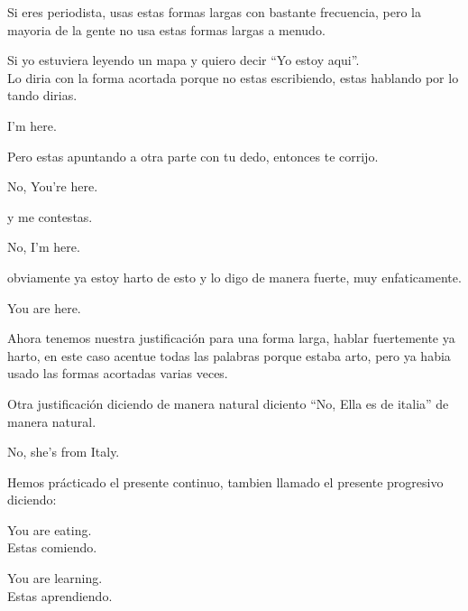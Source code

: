 Si eres periodista, usas estas formas largas con bastante frecuencia,
pero la mayoria de la gente no usa estas formas largas a menudo.

Si yo estuviera leyendo un mapa y quiero decir ``Yo estoy aqui''.\\
Lo diria con la forma acortada porque no estas escribiendo, estas hablando
por lo tando dirias.

I'm here.

Pero estas apuntando a otra parte con tu dedo, entonces te corrijo.

No, You're here.

y me contestas.

No, I'm here.

obviamente ya estoy harto de esto y lo digo de manera fuerte, muy
enfaticamente.

You are here.

Ahora tenemos nuestra justificación para una forma larga, hablar fuertemente
ya harto, en este caso acentue todas las palabras porque estaba arto, pero
ya habia usado las formas acortadas varias veces.

Otra justificación diciendo de manera natural diciento ``No, Ella es de italia''
de manera natural.

No, she's from Italy.

Hemos prácticado el presente continuo, tambien llamado el presente
progresivo diciendo:

You are eating.\\
Estas comiendo.

You are learning.\\
Estas aprendiendo.

















